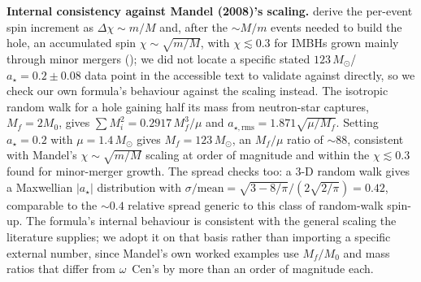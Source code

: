 \documentclass[11pt]{article}
\newcommand{\msun}{\ensuremath{M_\odot}}
\newcommand{\astar}{\ensuremath{a_\star}}
\newcommand{\ocen}{\ensuremath{\omega}~Cen}
\begin{document}
\textbf{Internal consistency against Mandel (2008)'s scaling.} \citet{Mandel2008} derive the per-event spin increment as $\Delta\chi \sim m/M$ and, after the $\sim M/m$ events needed to build the hole, an accumulated spin $\chi \sim \sqrt{m/M}$, with $\chi \lesssim 0.3$ for IMBHs grown mainly through minor mergers (\citealt{HughesBlandford2003}); we did not locate a specific stated $123\,\msun$/$a_\star = 0.2 \pm 0.08$ data point in the accessible text to validate against directly, so we check our own formula's behaviour against the scaling instead. The isotropic random walk for a hole gaining half its mass from neutron-star captures, $M_{f} = 2M_{0}$, gives $\sum M_{i}^{2} = 0.2917\,M_{f}^{3}/\mu$ and $a_{\star,\mathrm{rms}} = 1.871\sqrt{\mu/M_{f}}$. Setting $\astar = 0.2$ with $\mu = 1.4\,\msun$ gives $M_{f} = 123\,\msun$, an $M_f/\mu$ ratio of $\sim 88$, consistent with Mandel's $\chi \sim \sqrt{m/M}$ scaling at order of magnitude and within the $\chi \lesssim 0.3$ found for minor-merger growth. The spread checks too: a 3-D random walk gives a Maxwellian $|\astar|$ distribution with $\sigma/\mathrm{mean} = \sqrt{3 - 8/\pi}/(2\sqrt{2/\pi}) = 0.42$, comparable to the $\sim 0.4$ relative spread generic to this class of random-walk spin-up. The formula's internal behaviour is consistent with the general scaling the literature supplies; we adopt it on that basis rather than importing a specific external number, since Mandel's own worked examples use $M_f/M_0$ and mass ratios that differ from \ocen's by more than an order of magnitude each.
\end{document}
